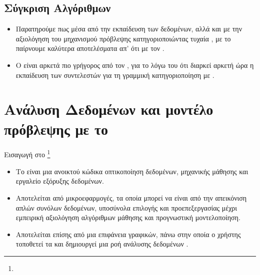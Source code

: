 \documentclass{beamer}
\begin{document}
\subsection{Σύγκριση Αλγόριθμων}
\begin{frame}
\begin{flushleft}
{} 
\end{flushleft}
\vfill
\begin{itemize}
\item Παρατηρούμε πως μέσα από την εκπαίδευση των δεδομένων, αλλά και με την αξιολόγηση του μηχανισμού πρόβλεψης κατηγοριοποιώντας τυχαία {}, με το {} παίρνουμε καλύτερα αποτελέσματα απ’ ότι με τον {}.
\vfill
\item Ο {} είναι αρκετά πιο γρήγορος από τον {}, για το λόγω του ότι διαρκεί αρκετή ώρα η εκπαίδευση των συντελεστών για τη γραμμική κατηγοριοποίηση με {}.  
\end{itemize}
\end{frame}

\section{Ανάλυση Δεδομένων και μοντέλο πρόβλεψης με το {}}


\begin{frame}
\begin{flushleft}
{\color{blue}Εισαγωγή στο {}} \footnote{{}}
\end{flushleft}
\vfill
\begin{itemize}
\item Το {} είναι μια ανοικτού κώδικα οπτικοποίηση δεδομένων, μηχανικής μάθησης και εργαλείο εξόρυξης δεδομένων.
\item Αποτελείται από μικροεφαρμογές{}, τα οποία μπορεί να είναι από την απεικόνιση απλών συνόλων δεδομένων, υποσύνολα επιλογής και προεπεξεργασίας μέχρι εμπειρική αξιολόγηση αλγόριθμων μάθησης και προγνωστική μοντελοποίηση.
\item Αποτελείται επίσης από μια επιφάνεια γραφικών, πάνω στην οποία ο χρήστης τοποθετεί τα {} και δημιουργεί μια ροή ανάλυσης δεδομένων {}. 
\end{itemize}
\end{frame}
\end{document}
